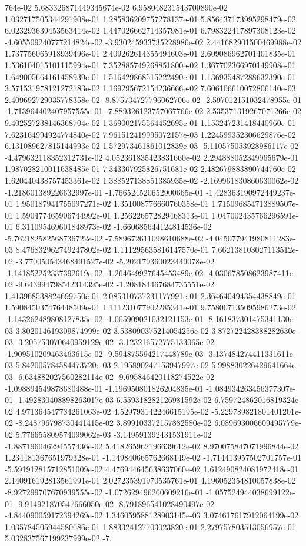 764e-02	5.683326871449345674e-02	6.958048231543700890e-02	1.032717505344291908e-01	1.285836209757278137e-01	5.856437173995298479e-02	6.023293639453563414e-02	1.447026662714357981e-01	6.798322417897308123e-02	-4.605509240777214824e-02	-3.930245933735228986e-02	2.441682901500469988e-02	1.737756065918939496e-01	2.409262614355494603e-01	2.609086962701401835e-01	1.536104015101115994e-01	7.352885749268851800e-02	1.367702366970149908e-01	1.649005664161458939e-01	1.516429868515222490e-01	1.136935487288632390e-01	3.571531978121272183e-02	1.169295672154236666e-02	7.606106610072806140e-03	2.409692729035778358e-02	-8.875734727796062706e-02	-2.597012151032478955e-01	-1.713964402407957555e-01	-7.889326123757067766e-02	2.535371319267071266e-02	9.402527238146368704e-02	1.369002175564452695e-01	1.153247231418440960e-01	7.623164994924774840e-02	7.961512419995072157e-03	1.224599352306629876e-02	6.131089627815144993e-02	1.572973461861012839e-03	-5.110575053928986117e-02	-4.479632118352312731e-02	4.052361835423831660e-02	2.294888052349965679e-01	1.987028210011638485e-01	7.343307925826751681e-02	2.482679883890744760e-02	1.620440438757453361e-02	1.388527138851385935e-02	-2.169961830860630062e-02	-1.218601389226632997e-01	-1.766524520652900665e-01	-1.428363190972449237e-01	1.950187941755097271e-02	1.351008776660760358e-01	1.715096854713889507e-01	1.590477465906744992e-01	1.256226572829468313e-01	1.047002435766296591e-01	6.311095469601848973e-02	-1.660685644124814536e-02	-5.762182582568736722e-02	-7.589672611098610688e-02	-4.045077941980811283e-03	8.476832962749247802e-02	1.111295635816147570e-01	7.662138103027113512e-02	-3.770050543468491527e-02	-5.202179360023449078e-02	-1.141852252337392619e-02	-1.264649927645453489e-02	-4.030678508623987411e-02	-9.643994798542314395e-02	-1.208184467684735551e-02	1.413968538824699750e-01	2.085310737231177991e-01	2.364640494354438849e-01	1.590845037476448509e-01	1.111231077902285341e-01	9.758007135095986273e-02	-1.143262489808127835e-02	-1.005909021032121153e-01	-8.161837301475341130e-03	3.802014619309874999e-02	3.538090375214054256e-02	3.872722428388282630e-03	-3.205753070640959129e-02	-3.123216572775133065e-02	-1.909510209463463615e-02	-9.594875594217448789e-03	-3.137484274411331611e-03	5.842005784584473720e-03	2.195890247153947997e-02	5.998830226429641664e-03	-6.634882027560282114e-02	-9.695846420118274522e-02	-1.098894549878680488e-01	-1.196950801826204835e-01	-1.084934263456377307e-01	-1.492830408898263017e-03	6.559318282126981592e-02	6.759724862016819324e-02	4.971364547734261063e-02	4.529793142246615195e-02	-5.229789821801401201e-02	-8.248796798730441415e-02	3.899103372157882580e-02	6.089693006609495779e-02	5.776655809574099062e-03	-3.149591392431531911e-02	-1.887196046294557436e-02	5.418265962196639612e-02	8.970075847071996844e-02	1.234481367651979328e-01	-1.149840665762668149e-02	-1.714413957502701757e-01	-5.591912815712851009e-02	4.476944645638637060e-02	1.612490824081972418e-01	2.140916192813561991e-01	2.027235391970535761e-01	4.196052354810057838e-02	-8.927299707670939555e-02	-1.072629496260609216e-01	-1.057524944038699122e-01	-9.914921870547666050e-02	-8.791896541028490497e-02	-4.844090059172394269e-02	1.346059588128903145e-03	3.074617617912064199e-02	1.035784505944580686e-01	1.883324127703023820e-01	2.279757803513056957e-01	5.032837567199237999e-02	-7.